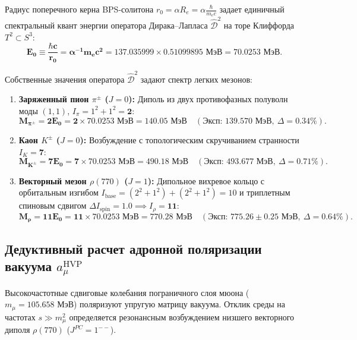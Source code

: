\documentclass[11pt,a4paper]{article}
\theoremstyle{definition}
\theoremstyle{remark}
\begin{document}
Радиус поперечного керна BPS-солитона $r_0 = \alpha R_e = \alpha \frac{\hbar}{m_e c}$ задает единичный спектральный квант энергии оператора Дирака--Лапласа $\hat{\mathcal{D}}^2$ на торе Клиффорда $T^2 \subset S^3$:
\begin{equation}
    \mathbf{E_0 \equiv \frac{\hbar c}{r_0} = \alpha^{-1} m_e c^2 = 137.035999 \times 0.51099895\text{ МэВ} = \mathbf{70.0253\text{ МэВ}}}.
    \label{eq:nambu_quantum_exact}
\end{equation}

Собственные значения оператора $\hat{\mathcal{D}}^2$ задают спектр легких мезонов:
\begin{enumerate}
    \item \textbf{Заряженный пион $\pi^\pm$ ($J=0$):} Диполь из двух противофазных полуволн моды $(1,1)$, $I_\pi = 1^2 + 1^2 = \mathbf{2}$:
    \begin{equation}
        \mathbf{M_{\pi^\pm} = 2 E_0 = 2 \times 70.0253\text{ МэВ} = \mathbf{140.05\text{ МэВ}}} \quad (\text{Эксп: } 139.570\text{ МэВ}, \ \Delta = 0.34\%).
    \end{equation}
    
    \item \textbf{Каон $K^\pm$ ($J=0$):} Возбуждение с топологическим скручиванием странности $I_K = \mathbf{7}$:
    \begin{equation}
        \mathbf{M_{K^\pm} = 7 E_0 = 7 \times 70.0253\text{ МэВ} = \mathbf{490.18\text{ МэВ}}} \quad (\text{Эксп: } 493.677\text{ МэВ}, \ \Delta = 0.71\%).
    \end{equation}
    
    \item \textbf{Векторный мезон $\rho(770)$ ($J=1$):} Дипольное вихревое кольцо с орбитальным изгибом $I_{\mathrm{base}} = (2^2+1^2) + (2^2+1^2) = 10$ и триплетным спиновым сдвигом $\Delta I_{\mathrm{spin}} = 1.0 \implies I_\rho = \mathbf{11}$:
    \begin{equation}
        \mathbf{M_\rho = 11 E_0 = 11 \times 70.0253\text{ МэВ} = \mathbf{770.28\text{ МэВ}}} \quad (\text{Эксп: } 775.26 \pm 0.25\text{ МэВ}, \ \Delta = 0.64\%).
    \end{equation}
\end{enumerate}

\subsection{Дедуктивный расчет адронной поляризации вакуума $a_\mu^{\mathrm{HVP}}$}
Высокочастотные сдвиговые колебания пограничного слоя мюона ($m_\mu = 105.658\text{ МэВ}$) поляризуют упругую матрицу вакуума. Отклик среды на частотах $s \gg m_\mu^2$ определяется резонансным возбуждением низшего векторного диполя $\rho(770)$ ($J^{PC} = 1^{--}$).
\end{document}
